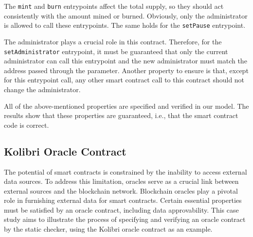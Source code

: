 \documentclass[a4paper,USenglish,cleveref, autoref, thm-restate]{lipics-v2021}
\begin{document}
The \lstinline/mint/ and \lstinline/burn/ entrypoints affect the total
supply, so they should act consistently with the amount mined or
burned. Obviously, only the administrator is allowed to call these
entrypoints. The same holds for the \lstinline/setPause/ entrypoint.

The administrator plays a crucial role in this contract. Therefore,
for the \lstinline/setAdministrator/ entrypoint, it must be guaranteed
that only the current administrator can call this entrypoint and the
new administrator must match the address passed through the
parameter. Another property to ensure is that, except for this
entrypoint call, any other smart contract call to this contract should
not change the administrator. 

All of the above-mentioned properties are specified and verified in
our model. The results show that these properties are guaranteed,
i.e., that the smart contract code is correct.

\subsection{Kolibri Oracle Contract}
\label{sec:kolibri-oracle-contr}
The potential of smart contracts is constrained by the inability to
access external data sources. To address this limitation, oracles
serve as a crucial link between external sources and the blockchain
network.  Blockchain oracles play a pivotal role in furnishing
external data for smart contracts. Certain essential properties must
be satisfied by an oracle contract, including data approvability. This
case study aims to illustrate the process of specifying and verifying
an oracle contract by the static checker, using the Kolibri oracle
contract as an example.
\end{document}
